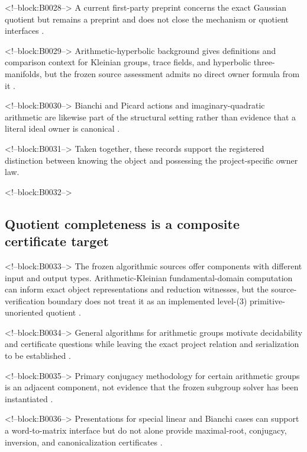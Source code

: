 \documentclass[11pt,a4paper]{article}
\begin{document}
<!--block:B0028-->
A current first-party preprint concerns the exact Gaussian quotient but remains a preprint and does not close the mechanism or quotient interfaces
\citep{P29-S09}.

<!--block:B0029-->
Arithmetic-hyperbolic background gives definitions and comparison context for Kleinian groups, trace fields, and hyperbolic three-manifolds, but the frozen source assessment admits no direct owner formula from it
\citep{P29-S17}.

<!--block:B0030-->
Bianchi and Picard actions and imaginary-quadratic arithmetic are likewise part of the structural setting rather than evidence that a literal ideal owner is canonical
\citep{P29-S18}.

<!--block:B0031-->
Taken together, these records support the registered distinction between knowing the object and possessing the project-specific owner law.

<!--block:B0032-->
\subsection{Quotient completeness is a composite certificate target}

<!--block:B0033-->
The frozen algorithmic sources offer components with different input and output types. Arithmetic-Kleinian fundamental-domain computation can inform exact object representations and reduction witnesses, but the source-verification boundary does not treat it as an implemented level-(3) primitive-unoriented quotient
\citep{P29-S10}.

<!--block:B0034-->
General algorithms for arithmetic groups motivate decidability and certificate questions while leaving the exact project relation and serialization to be established
\citep{P29-S11}.

<!--block:B0035-->
Primary conjugacy methodology for certain arithmetic groups is an adjacent component, not evidence that the frozen subgroup solver has been instantiated
\citep{P29-S15}.

<!--block:B0036-->
Presentations for special linear and Bianchi cases can support a word-to-matrix interface but do not alone provide maximal-root, conjugacy, inversion, and canonicalization certificates
\citep{P29-S16}.
\end{document}

